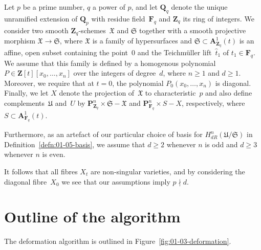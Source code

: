 \begin{notation} \label{not:01-03-main}
Let $p$ be a prime number, $q$ a power of $p$, and let $\mathbf{Q}_q$ 
denote the unique unramified extension of $\mathbf{Q}_p$ with residue 
field~$\mathbf{F}_q$ and $\mathbf{Z}_q$ its ring of integers.  
We consider two smooth $\mathbf{Z}_q$-schemes~$\mathfrak{X}$ and $\mathfrak{S}$ 
together with a smooth projective morphism $\mathfrak{X} \to \mathfrak{S}$, 
where $\mathfrak{X}$ is a family of hypersurfaces 
and $\mathfrak{S} \subset \mathbf{A}_{\mathbf{Z}_q}^1(t)$ is an affine, open 
subset containing the point~$0$ and the Teichm\"uller lift~$\hat{t}_1$ of 
$t_1 \in \mathbf{F}_q$.  
We assume that this family is defined by a homogenous polynomial 
$P \in \mathbf{Z}[t][x_0,\dotsc,x_n]$ over the integers of degree~$d$, 
where $n \geq 1$ and $d \geq 1$.  
Moreover, we require that at $t = 0$, the polynomial $P_0(x_0,\dotsc,x_n)$ 
is diagonal.  Finally, we let $X$ denote the projection of~$\mathfrak{X}$ 
to characteristic~$p$ and also define complements~$\mathfrak{U}$ and~$U$ 
by $\mathbf{P}_{\mathbf{Z}_q}^n \times \mathfrak{S} - \mathfrak{X}$ 
and $\mathbf{P}_{\mathbf{F}_q}^n \times S - X$, respectively, 
where $S \subset \mathbf{A}_{\mathbf{F}_q}^1(t)$.  
\end{notation}

\begin{notation}
Furthermore, as an artefact of our particular choice of basis for 
$H_{dR}^n(\mathfrak{U}/\mathfrak{S})$ in Definition~\ref{defn:01-05-basis}, 
we assume that $d \geq 2$ whenever $n$ is odd and $d \geq 3$ whenever $n$ 
is even.
\end{notation}

\begin{rem}
It follows that all fibres $X_t$ are non-singular varieties, 
and by considering the diagonal fibre~$X_0$ we see that our 
assumptions imply $p \nmid d$.
\end{rem}


\section{Outline of the algorithm}

The deformation algorithm is outlined in Figure~\ref{fig:01-03-deformation}.

